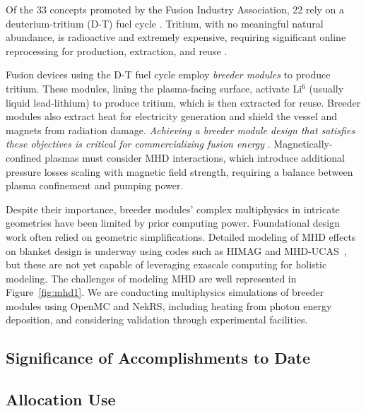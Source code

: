 Of the 33 concepts promoted by the Fusion Industry Association, 22 rely on a deuterium-tritium (D-T) fuel cycle \cite{tfi}. Tritium, with no meaningful natural abundance, is radioactive and extremely expensive, requiring significant online reprocessing for production, extraction, and reuse \cite{tanabe}.

Fusion devices using the D-T fuel cycle employ {\it breeder modules} to produce tritium. These modules, lining the plasma-facing surface, activate Li$^6$ (usually liquid lead-lithium) to produce tritium, which is then extracted for reuse. Breeder modules also extract heat for electricity generation and shield the vessel and magnets from radiation damage. {\it Achieving a breeder module design that satisfies these objectives is critical for commercializing fusion energy} \cite{tillack}. Magnetically-confined plasmas must consider MHD interactions, which introduce additional pressure losses scaling with magnetic field strength, requiring a balance between plasma confinement and pumping power.

Despite their importance, breeder modules' complex multiphysics in intricate geometries have been limited by prior computing power. Foundational design work often relied on geometric simplifications. Detailed modeling of MHD effects on blanket design is underway using codes such as HIMAG and MHD-UCAS~\cite{smolentsev2023}, but these are not yet capable of leveraging exascale computing for holistic modeling.  The challenges of modeling MHD are well represented in Figure~\ref{fig:mhd1}. We are conducting multiphysics simulations of breeder modules using OpenMC and NekRS, including heating from photon energy deposition, and considering validation through experimental facilities.

\vspace*{-.25in} \subsection{Significance of Accomplishments to Date}
\vspace*{-.20in}




\vspace{-.25in}
\subsection{Allocation Use}
\label{sec:usage2}
\vspace{-.2in}

